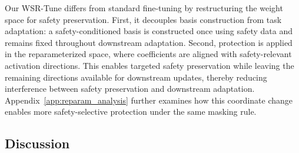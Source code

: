 \documentclass{article}
\newcommand{\kms}[1]{{\leavevmode\color{blue}[MS: #1]}}
\newcommand{\wjb}[1]{{\leavevmode\color{orange}[jb: #1]}}
\begin{document}

Our WSR-Tune differs from standard fine-tuning by restructuring the weight space for safety preservation. First, it decouples basis construction from task adaptation: a safety-conditioned basis is constructed once using safety data and remains fixed throughout downstream adaptation. Second, protection is applied in the reparameterized space, where coefficients are aligned with safety-relevant activation directions. This enables targeted safety preservation while leaving the remaining directions available for downstream updates, thereby reducing interference between safety preservation and downstream adaptation. Appendix~\ref{app:reparam_analysis} further examines how this coordinate change enables more safety-selective protection under the same masking rule.








\subsection{Discussion}
\end{document}
